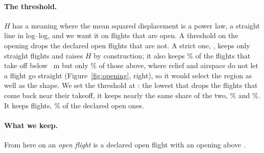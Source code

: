 \paragraph{The threshold.} $H$ has a meaning where the mean squared displacement is a power law, a straight
line in log--log, and we want it on flights that are open. A threshold on the opening drops the declared
open flights that are not. A strict one, \Stricter, keeps only straight flights and raises $H$ by
construction; it also keeps \TakeoffLowStrict\% of the flights that take off below \MountainM~m but only
\TakeoffHighStrict\% of those above, where relief and airspace do not let a flight go straight
(Figure~\ref{fig:opening}, right), so it would select the region as well as the shape. We set the
threshold at \MinOpening: the lowest that drops the flights that come back near their takeoff, it keeps
nearly the same share of the two, \TakeoffLowKeep\% and \TakeoffHighKeep\%. It keeps \Kept{} flights,
\KeptShare\% of the declared open ones.

\paragraph{What we keep.} From here on an \emph{open flight} is a declared open flight with an opening above
\MinOpening.

